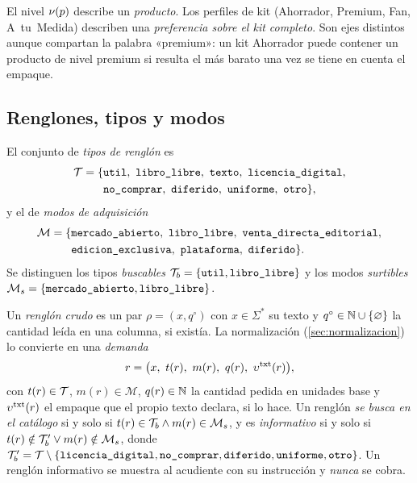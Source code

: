 \begin{observacion}
El nivel $\nu(p)$ describe un \emph{producto}. Los perfiles de kit
(Ahorrador, Premium, Fan, A~tu~Medida) describen una \emph{preferencia sobre
el kit completo}. Son ejes distintos aunque compartan la palabra «premium»: un
kit Ahorrador puede contener un producto de nivel premium si resulta el más
barato una vez se tiene en cuenta el empaque.
\end{observacion}

\subsection{Renglones, tipos y modos}

\begin{definicion}
\label{def:tipos}
El conjunto de \emph{tipos de renglón} es
\begin{align*}
  \Tipos = \{&\cod{util},\ \cod{libro\_libre},\ \cod{texto},\ \cod{licencia\_digital},\\
             &\cod{no\_comprar},\ \cod{diferido},\ \cod{uniforme},\ \cod{otro}\},
\end{align*}
y el de \emph{modos de adquisición}
\begin{align*}
  \mathcal{M} = \{&\cod{mercado\_abierto},\ \cod{libro\_libre},\ \cod{venta\_directa\_editorial},\\
                  &\cod{edicion\_exclusiva},\ \cod{plataforma},\ \cod{diferido}\}.
\end{align*}
Se distinguen los tipos \emph{buscables} $\mathcal{T}_b=\{\texttt{util},
\texttt{libro\_libre}\}$ y los modos \emph{surtibles}
$\mathcal{M}_s=\{\texttt{mercado\_abierto},\texttt{libro\_libre}\}$.
\end{definicion}

\begin{definicion}
\label{def:renglon}
Un \emph{renglón crudo} es un par $\rho=(x,q^\circ)$ con $x\in\Sigma^*$ su
texto y $q^\circ\in\mathbb{N}\cup\{\varnothing\}$ la cantidad leída en una columna, si
existía. La normalización (\cref{sec:normalizacion}) lo convierte en una
\emph{demanda}
\[
  r = \bigl(x,\ t(r),\ m(r),\ q(r),\ \emp^{\mathrm{txt}}(r)\bigr),
\]
con $t(r)\in\mathcal{T}$, $m(r)\in\mathcal{M}$, $q(r)\in\mathbb{N}$ la cantidad pedida en
unidades base y $\upsilon^{\mathrm{txt}}(r)$ el empaque que el propio texto
declara, si lo hace. Un renglón \emph{se busca en el catálogo} si y solo si
$t(r)\in\mathcal{T}_b \wedge m(r)\in\mathcal{M}_s$, y es \emph{informativo} si y
solo si $t(r)\notin\mathcal{T}_b' \vee m(r)\notin\mathcal{M}_s$, donde
$\mathcal{T}_b'=\mathcal{T}\setminus\{\texttt{licencia\_digital},\texttt{no\_comprar},
\texttt{diferido},\texttt{uniforme},\texttt{otro}\}$. Un renglón informativo se
muestra al acudiente con su instrucción y \emph{nunca} se cobra.
\end{definicion}

